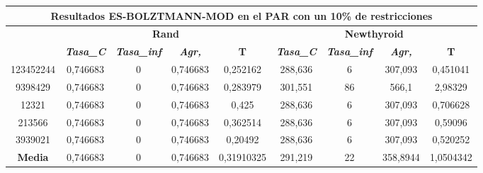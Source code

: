 \documentclass[12pt, spanish]{article}
\begin{document}
\begin{table}[H]
\begin{tabular}{|c|c|c|c|c|c|c|c|c|}
\hline
\multicolumn{9}{|c|}{\textbf{Resultados ES-BOLZTMANN-MOD en el PAR con un 10\% de restricciones}}                                                                                                                 \\ \hline
\multirow{2}{*}{} & \multicolumn{4}{c|}{\textbf{Rand}}                                                            & \multicolumn{4}{c|}{\textbf{Newthyroid}}                                                      \\ \cline{2-9} 
                  & \textit{\textbf{Tasa\_C}} & \textit{\textbf{Tasa\_inf}} & \textit{\textbf{Agr,}} & \textbf{T} & \textit{\textbf{Tasa\_C}} & \textit{\textbf{Tasa\_inf}} & \textit{\textbf{Agr,}} & \textbf{T} \\ \hline
123452244         & 0,746683                  & 0                           & 0,746683               & 0,252162   & 288,636                   & 6                           & 307,093                & 0,451041   \\ \hline
9398429           & 0,746683                  & 0                           & 0,746683               & 0,283979   & 301,551                   & 86                          & 566,1                  & 2,98329    \\ \hline
12321             & 0,746683                  & 0                           & 0,746683               & 0,425      & 288,636                   & 6                           & 307,093                & 0,706628   \\ \hline
213566            & 0,746683                  & 0                           & 0,746683               & 0,362514   & 288,636                   & 6                           & 307,093                & 0,59096    \\ \hline
3939021           & 0,746683                  & 0                           & 0,746683               & 0,20492    & 288,636                   & 6                           & 307,093                & 0,520252   \\ \hline
\textbf{Media}    & 0,746683                  & 0                           & 0,746683               & 0,31910325 & 291,219                   & 22                          & 358,8944               & 1,0504342  \\ \hline
\end{tabular}
\end{table}
\end{document}
